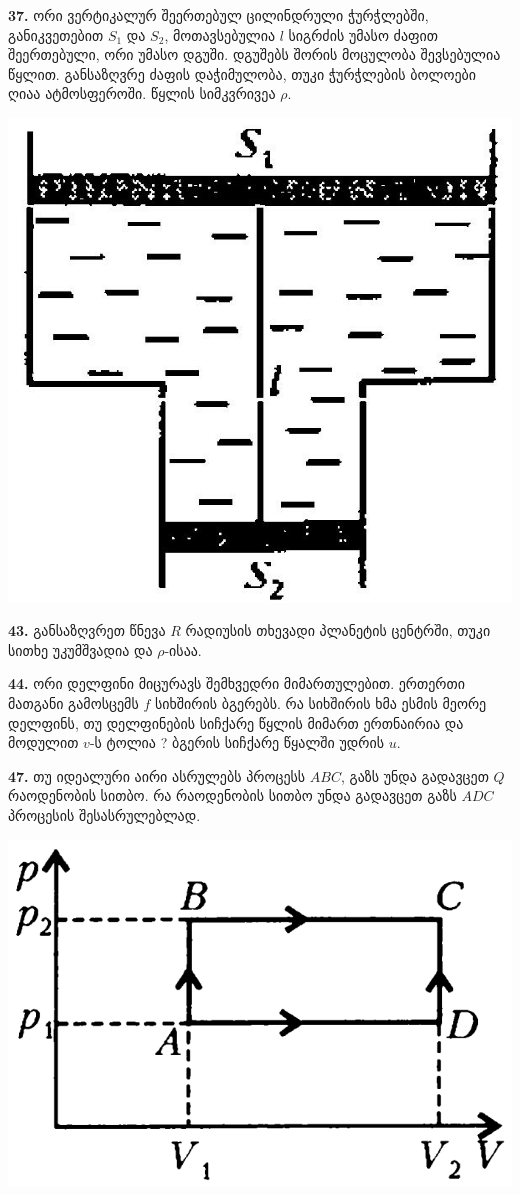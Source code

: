 \documentclass[12pt,a4paper,]{report}
\begin{document}
\textbf{37.} ორი ვერტიკალურ შეერთებულ ცილინდრული ჭურჭლებში, განიკვეთებით $S_1$ და $S_2$, მოთავსებულია $l$ სიგრძის უმასო ძაფით შეერთებული, ორი უმასო დგუში. დგუშებს შორის მოცულობა შევსებულია წყლით. განსაზღვრე ძაფის დაჭიმულობა, თუკი ჭურჭლების ბოლოები ღიაა ატმოსფეროში. წყლის სიმკვრივეა $\rho$.
	\begin{center}
		\includegraphics[scale=0.2]{images/F37.jpg}
	\end{center}

\textbf{43.} განსაზღვრეთ წნევა $R$ რადიუსის თხევადი პლანეტის ცენტრში, თუკი სითხე უკუმშვადია და $\rho$-ისაა.

\textbf{44.} ორი დელფინი მიცურავს შემხვედრი მიმართულებით. ერთერთი მათგანი გამოსცემს $f$ სიხშირის ბგერებს. რა სიხშირის ხმა ესმის მეორე დელფინს, თუ დელფინების სიჩქარე წყლის მიმართ ერთნაირია და მოდულით $v$-ს ტოლია ? ბგერის სიჩქარე წყალში უდრის $u$.

\textbf{47.} თუ იდეალური აირი ასრულებს პროცესს $ABC$, გაზს უნდა გადავცეთ $Q$ რაოდენობის სითბო. რა რაოდენობის სითბო უნდა გადავცეთ გაზს $ADC$ პროცესის შესასრულებლად. 
	\begin{center}
		\includegraphics[scale=0.3]{images/47}
	\end{center}
		
\end{document}

